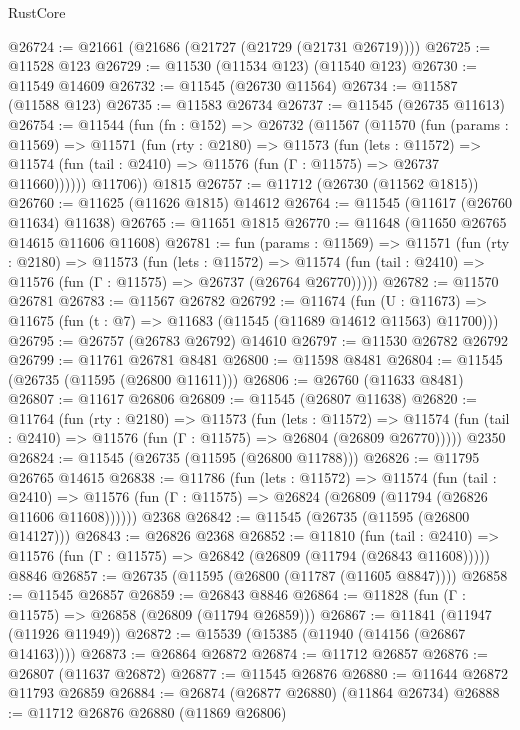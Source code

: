 \begin{lexlean}{RustCore}
\begin{coremodule}
@26724 := @21661 (@21686 (@21727 (@21729 (@21731 @26719))))
@26725 := @11528 @123
@26729 := @11530 (@11534 @123) (@11540 @123)
@26730 := @11549 @14609
@26732 := @11545 (@26730 @11564)
@26734 := @11587 (@11588 @123)
@26735 := @11583 @26734
@26737 := @11545 (@26735 @11613)
@26754 := @11544
    (fun (fn : @152) =>
    @26732
      (@11567
        (@11570
          (fun (params : @11569) =>
          @11571
            (fun (rty : @2180) =>
            @11573
              (fun (lets : @11572) =>
              @11574 (fun (tail : @2410) => @11576 (fun (Γ : @11575) => @26737 @11660))))))
        @11706))
    @1815
@26757 := @11712 (@26730 (@11562 @1815))
@26760 := @11625 (@11626 @1815) @14612
@26764 := @11545 (@11617 (@26760 @11634) @11638)
@26765 := @11651 @1815
@26770 := @11648 (@11650 @26765 @14615 @11606 @11608)
@26781 := fun (params : @11569) =>
  @11571
    (fun (rty : @2180) =>
    @11573
      (fun (lets : @11572) =>
      @11574 (fun (tail : @2410) => @11576 (fun (Γ : @11575) => @26737 (@26764 @26770)))))
@26782 := @11570 @26781
@26783 := @11567 @26782
@26792 := @11674
    (fun (U : @11673) => @11675 (fun (t : @7) => @11683 (@11545 (@11689 @14612 @11563) @11700)))
@26795 := @26757 (@26783 @26792) @14610
@26797 := @11530 @26782 @26792
@26799 := @11761 @26781 @8481
@26800 := @11598 @8481
@26804 := @11545 (@26735 (@11595 (@26800 @11611)))
@26806 := @26760 (@11633 @8481)
@26807 := @11617 @26806
@26809 := @11545 (@26807 @11638)
@26820 := @11764
    (fun (rty : @2180) =>
    @11573
      (fun (lets : @11572) =>
      @11574 (fun (tail : @2410) => @11576 (fun (Γ : @11575) => @26804 (@26809 @26770)))))
    @2350
@26824 := @11545 (@26735 (@11595 (@26800 @11788)))
@26826 := @11795 @26765 @14615
@26838 := @11786
    (fun (lets : @11572) =>
    @11574
      (fun (tail : @2410) =>
      @11576 (fun (Γ : @11575) => @26824 (@26809 (@11794 (@26826 @11606 @11608))))))
    @2368
@26842 := @11545 (@26735 (@11595 (@26800 @14127)))
@26843 := @26826 @2368
@26852 := @11810
    (fun (tail : @2410) => @11576 (fun (Γ : @11575) => @26842 (@26809 (@11794 (@26843 @11608)))))
    @8846
@26857 := @26735 (@11595 (@26800 (@11787 (@11605 @8847))))
@26858 := @11545 @26857
@26859 := @26843 @8846
@26864 := @11828 (fun (Γ : @11575) => @26858 (@26809 (@11794 @26859)))
@26867 := @11841 (@11947 (@11926 @11949))
@26872 := @15539 (@15385 (@11940 (@14156 (@26867 @14163))))
@26873 := @26864 @26872
@26874 := @11712 @26857
@26876 := @26807 (@11637 @26872)
@26877 := @11545 @26876
@26880 := @11644 @26872 @11793 @26859
@26884 := @26874 (@26877 @26880) (@11864 @26734)
@26888 := @11712 @26876 @26880 (@11869 @26806)

\end{coremodule}
\end{lexlean}
